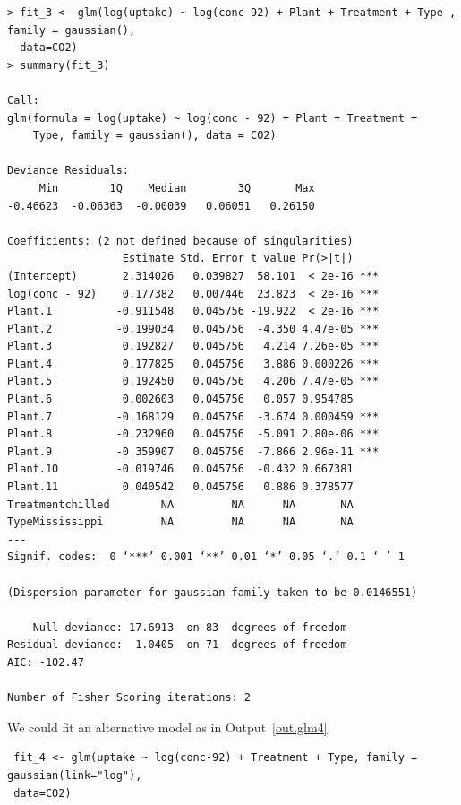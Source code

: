 \documentclass[11pt,a4paper%
addpoints, 
answers%
]{exam}
\begin{document}
\begin{questions}
\begin{center}
\begin{verbatim}
> fit_3 <- glm(log(uptake) ~ log(conc-92) + Plant + Treatment + Type , family = gaussian(),
  data=CO2)
> summary(fit_3)

Call:
glm(formula = log(uptake) ~ log(conc - 92) + Plant + Treatment + 
    Type, family = gaussian(), data = CO2)

Deviance Residuals: 
     Min        1Q    Median        3Q       Max  
-0.46623  -0.06363  -0.00039   0.06051   0.26150  

Coefficients: (2 not defined because of singularities)
                  Estimate Std. Error t value Pr(>|t|)    
(Intercept)       2.314026   0.039827  58.101  < 2e-16 ***
log(conc - 92)    0.177382   0.007446  23.823  < 2e-16 ***
Plant.1          -0.911548   0.045756 -19.922  < 2e-16 ***
Plant.2          -0.199034   0.045756  -4.350 4.47e-05 ***
Plant.3           0.192827   0.045756   4.214 7.26e-05 ***
Plant.4           0.177825   0.045756   3.886 0.000226 ***
Plant.5           0.192450   0.045756   4.206 7.47e-05 ***
Plant.6           0.002603   0.045756   0.057 0.954785    
Plant.7          -0.168129   0.045756  -3.674 0.000459 ***
Plant.8          -0.232960   0.045756  -5.091 2.80e-06 ***
Plant.9          -0.359907   0.045756  -7.866 2.96e-11 ***
Plant.10         -0.019746   0.045756  -0.432 0.667381    
Plant.11          0.040542   0.045756   0.886 0.378577    
Treatmentchilled        NA         NA      NA       NA    
TypeMississippi         NA         NA      NA       NA    
---
Signif. codes:  0 ‘***’ 0.001 ‘**’ 0.01 ‘*’ 0.05 ‘.’ 0.1 ‘ ’ 1

(Dispersion parameter for gaussian family taken to be 0.0146551)

    Null deviance: 17.6913  on 83  degrees of freedom
Residual deviance:  1.0405  on 71  degrees of freedom
AIC: -102.47

Number of Fisher Scoring iterations: 2

\end{verbatim}
\end{center}


\question[2] We could fit an alternative model as in Output~\ref{out.glm4}.

\begin{center}
\begin{verbatim}
 fit_4 <- glm(uptake ~ log(conc-92) + Treatment + Type, family = gaussian(link="log"), 
 data=CO2)
\end{verbatim}
\end{center}


\end{questions}
\end{document}
